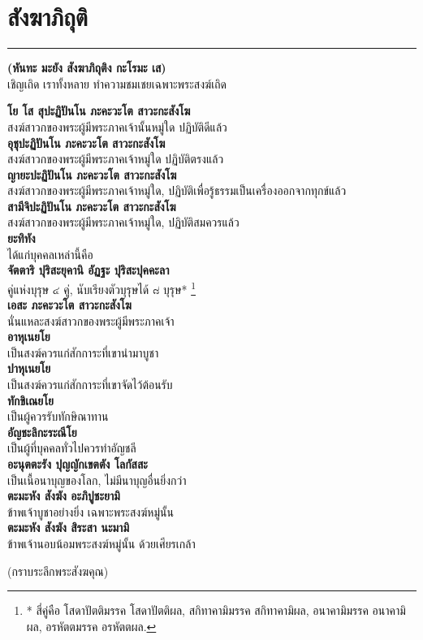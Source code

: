 \documentclass[12pt]{article}
\begin{document}
\section{สังฆาภิถุติ}
\hrule
\begin{center}
\textbf{(หันทะ มะยัง สังฆาภิถุติง กะโรมะ เส)\\}
เชิญเถิด เราทั้งหลาย ทำความชมเชยเฉพาะพระสงฆ์เถิด
\end{center}
\textbf{โย โส สุปะฏิปันโน ภะคะวะโต สาวะกะสังโฆ\\}
\indent สงฆ์สาวกของพระผู้มีพระภาคเจ้านั้นหมู่ใด ปฏิบัติดีแล้ว\\
\textbf{อุชุปะฏิปันโน ภะคะวะโต สาวะกะสังโฆ\\}
\indent สงฆ์สาวกของพระผู้มีพระภาคเจ้าหมู่ใด ปฏิบัติตรงแล้ว\\
\textbf{ญายะปะฏิปันโน ภะคะวะโต สาวะกะสังโฆ\\}
\indent สงฆ์สาวกของพระผู้มีพระภาคเจ้าหมู่ใด, ปฏิบัติเพื่อรู้ธรรมเป็นเครื่องออกจากทุกข์แล้ว\\
\textbf{สามีจิปะฏิปันโน ภะคะวะโต สาวะกะสังโฆ\\}
\indent สงฆ์สาวกของพระผู้มีพระภาคเจ้าหมู่ใด, ปฏิบัติสมควรแล้ว\\
\textbf{ยะทิทัง\\}
\indent ได้แก่บุคคลเหล่านี้คือ\\
\textbf{จัตตาริ ปุริสะยุคานิ อัฏฐะ ปุริสะปุคคะลา\\}
\indent คู่แห่งบุรุษ ๔ คู่, นับเรียงตัวบุรุษได้ ๘ บุรุษ*
\footnote{* สี่คู่คือ โสดาปัตติมรรค โสดาปัตติผล, สกิทาคามิมรรค สกิทาคามิผล,
อนาคามิมรรค อนาคามิผล, อรหัตตมรรค อรหัตตผล.}\\
\textbf{เอสะ ภะคะวะโต สาวะกะสังโฆ\\}
\indent นั่นแหละสงฆ์สาวกของพระผู้มีพระภาคเจ้า\\
\textbf{อาหุเนยโย\\}
\indent เป็นสงฆ์ควรแก่สักการะที่เขานำมาบูชา\\
\textbf{ปาหุเนยโย\\}
\indent เป็นสงฆ์ควรแก่สักการะที่เขาจัดไว้ต้อนรับ\\
\textbf{ทักขิเณยโย\\}
\indent เป็นผู้ควรรับทักษิณาทาน\\
\textbf{อัญชะลิกะระณีโย\\}
\indent เป็นผู้ที่บุคคลทั่วไปควรทำอัญชลี\\
\textbf{อะนุตตะรัง ปุญญักเขตตัง โลกัสสะ\\}
\indent เป็นเนื้อนาบุญของโลก, ไม่มีนาบุญอื่นยิ่งกว่า\\
\textbf{ตะมะหัง สังฆัง อะภิปูชะยามิ\\}
\indent ข้าพเจ้าบูชาอย่างยิ่ง เฉพาะพระสงฆ์หมู่นั้น\\
\textbf{ตะมะหัง สังฆัง สิระสา นะมามิ\\}
\indent ข้าพเจ้านอบน้อมพระสงฆ์หมู่นั้น ด้วยเศียรเกล้า\\
\begin{center}
(กราบระลึกพระสังฆคุณ)
\end{center}
\pagebreak
\end{document}
